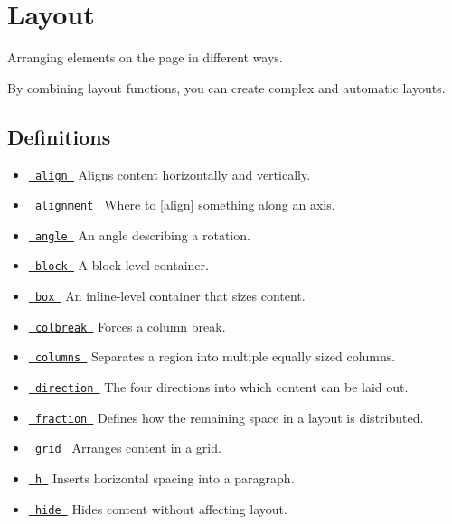 \section{Layout}\label{summary}

Arranging elements on the page in different ways.

By combining layout functions, you can create complex and automatic
layouts.

\subsection{Definitions}\label{definitions}

\begin{itemize}
\tightlist
\item
  \href{/docs/reference/layout/align/}{\texttt{\ align\ }} { Aligns
  content horizontally and vertically. }
\item
  \href{/docs/reference/layout/alignment/}{\texttt{\ alignment\ }} {
  Where to {[}align{]} something along an axis. }
\item
  \href{/docs/reference/layout/angle/}{\texttt{\ angle\ }} { An angle
  describing a rotation. }
\item
  \href{/docs/reference/layout/block/}{\texttt{\ block\ }} { A
  block-level container. }
\item
  \href{/docs/reference/layout/box/}{\texttt{\ box\ }} { An inline-level
  container that sizes content. }
\item
  \href{/docs/reference/layout/colbreak/}{\texttt{\ colbreak\ }} {
  Forces a column break. }
\item
  \href{/docs/reference/layout/columns/}{\texttt{\ columns\ }} {
  Separates a region into multiple equally sized columns. }
\item
  \href{/docs/reference/layout/direction/}{\texttt{\ direction\ }} { The
  four directions into which content can be laid out. }
\item
  \href{/docs/reference/layout/fraction/}{\texttt{\ fraction\ }} {
  Defines how the remaining space in a layout is distributed. }
\item
  \href{/docs/reference/layout/grid/}{\texttt{\ grid\ }} { Arranges
  content in a grid. }
\item
  \href{/docs/reference/layout/h/}{\texttt{\ h\ }} { Inserts horizontal
  spacing into a paragraph. }
\item
  \href{/docs/reference/layout/hide/}{\texttt{\ hide\ }} { Hides content
  without affecting layout. }

\end{itemize}
